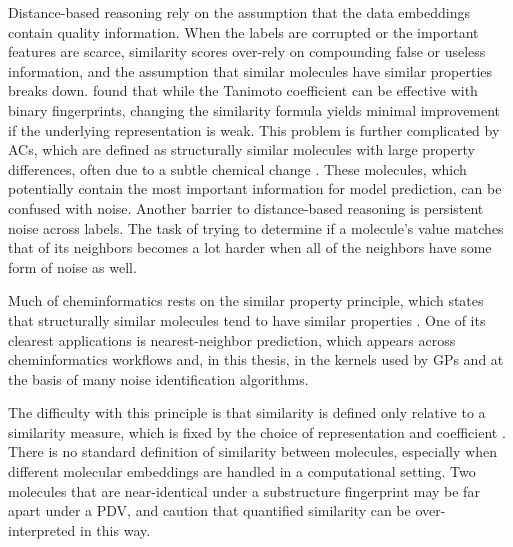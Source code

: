 Distance-based reasoning rely on the assumption that the data embeddings  contain quality information. When the labels are corrupted or the important features are scarce, similarity scores over-rely on compounding false or useless information, and the assumption that similar molecules have similar properties breaks down. %
\citet{Bajusz2015} found that while the Tanimoto coefficient can be effective with binary fingerprints, changing the similarity formula yields minimal improvement if the underlying representation is weak.
This problem is further complicated by ACs, which are defined as structurally similar molecules with large property differences, often due to a subtle chemical change \citep{Stumpfe2012, Dablander2023}. These molecules, which potentially contain the most important information for model prediction, can be confused with noise. Another barrier to distance-based reasoning is persistent noise across labels. The task of trying to determine if a molecule's value matches that of its neighbors becomes a lot harder when all of the neighbors have some form of noise as well. 


Much of cheminformatics rests on the similar property principle, which states that structurally similar molecules tend to have similar properties \citep{Johnson1990, vanTilborg2022}.
One of its clearest applications is nearest-neighbor prediction, which appears across cheminformatics workflows and, in this thesis, in the kernels used by GPs and at the basis of many noise identification algorithms.

The difficulty with this principle is that similarity is defined only relative to a similarity measure, which is fixed by the choice of representation and
coefficient \citep{Maggiora2014}. There is no standard definition of similarity between molecules, especially when different molecular embeddings are handled in a computational setting. Two molecules that are near-identical under a substructure fingerprint may be far apart under a PDV, and \citet{Maggiora2014} caution that quantified similarity can be over-interpreted in this way.

